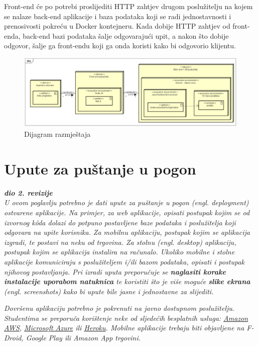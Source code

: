 			 Front-end će po potrebi proslijediti HTTP zahtjev drugom poslužitelju na kojem se nalaze back-end aplikacije i baza podataka koji se radi jednostavnosti i prenosivosti pokreću u Docker kontejneru. Kada dobije HTTP zahtjev od front-enda, back-end bazi podataka šalje odgovarajući upit, a nakon što dobije odgovor, šalje ga front-endu koji ga onda koristi kako bi odgovorio klijentu.
			\begin{figure}[H]
				\includegraphics[scale=0.35]{slike/dijagram_razmjestaja.png} %
				\centering
				\caption{Dijagram razmještaja}
				\label{fig:Dijagram razmještaja}
			\end{figure}
			\eject 
		
		\section{Upute za puštanje u pogon}
		
			\textbf{\textit{dio 2. revizije}}\\
		
			 \textit{U ovom poglavlju potrebno je dati upute za puštanje u pogon (engl. deployment) ostvarene aplikacije. Na primjer, za web aplikacije, opisati postupak kojim se od izvornog kôda dolazi do potpuno postavljene baze podataka i poslužitelja koji odgovara na upite korisnika. Za mobilnu aplikaciju, postupak kojim se aplikacija izgradi, te postavi na neku od trgovina. Za stolnu (engl. desktop) aplikaciju, postupak kojim se aplikacija instalira na računalo. Ukoliko mobilne i stolne aplikacije komuniciraju s poslužiteljem i/ili bazom podataka, opisati i postupak njihovog postavljanja. Pri izradi uputa preporučuje se \textbf{naglasiti korake instalacije uporabom natuknica} te koristiti što je više moguće \textbf{slike ekrana} (engl. screenshots) kako bi upute bile jasne i jednostavne za slijediti.}
			
			
			 \textit{Dovršenu aplikaciju potrebno je pokrenuti na javno dostupnom poslužitelju. Studentima se preporuča korištenje neke od sljedećih besplatnih usluga: \href{https://aws.amazon.com/}{Amazon AWS}, \href{https://azure.microsoft.com/en-us/}{Microsoft Azure} ili \href{https://www.heroku.com/}{Heroku}. Mobilne aplikacije trebaju biti objavljene na F-Droid, Google Play ili Amazon App trgovini.}
			
			
			\eject 